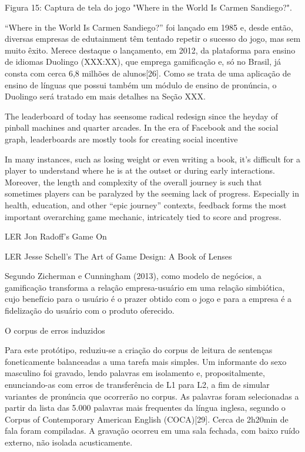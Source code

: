   Figura 15: Captura de tela do jogo "Where in the World Is Carmen
                             Sandiego?".

``Where in the World Is Carmen Sandiego?'' foi lan\c{c}ado em 1985 e, desde
ent\~ao, diversas empresas de edutainment t\^em tentado repetir o sucesso do
jogo, mas sem muito \^exito. Merece destaque o lan\c{c}amento, em 2012, da
plataforma para ensino de idiomas Duolingo (XXX:XX), que emprega
gamifica\c{c}\~ao e, s\'o no Brasil, j\'a consta com cerca 6,8 milh\~oes de
alunos{[}26{]}. Como se trata de uma aplica\c{c}\~ao de ensino de l\'inguas que
possui tamb\'em um m\'odulo de ensino de pron\'uncia, o Duolingo ser\'a tratado
em mais detalhes na Se\c{c}\~ao XXX.

The leaderboard of today has seensome radical redesign since the heyday
of pinball machines and quarter arcades. In the era of Facebook and the
social graph, leaderboards are mostly tools for creating social
incentive

In many instances, such as losing weight or even writing a book, it's
difficult for a player to understand where he is at the outset or during
early interactions. Moreover, the length and complexity of the overall
journey is such that sometimes players can be paralyzed by the seeming
lack of progress. Especially in health, education, and other ``epic
journey'' contexts, feedback forms the most important overarching game
mechanic, intricately tied to score and progress.

LER Jon Radoff's Game On

LER Jesse Schell's The Art of Game Design: A Book of Lenses

Segundo Zicherman e Cunningham (2013), como modelo de neg\'ocios, a
gamifica\c{c}\~ao transforma a rela\c{c}\~ao empresa-usu\'ario em uma rela\c{c}\~ao
simbi\'otica, cujo benef\'icio para o usu\'ario \'e o prazer obtido com o jogo e
para a empresa \'e a fideliza\c{c}\~ao do usu\'ario com o produto oferecido.

O corpus de erros induzidos

Para este prot\'otipo, reduziu-se a cria\c{c}\~ao do corpus de leitura de
senten\c{c}as foneticamente balanceadas a uma tarefa mais simples. Um
informante do sexo masculino foi gravado, lendo palavras em isolamento
e, propositalmente, enunciando-as com erros de transfer\^encia de L1 para
L2, a fim de simular variantes de pron\'uncia que ocorrer\~ao no corpus. As
palavras foram selecionadas a partir da lista das 5.000 palavras mais
frequentes da l\'ingua inglesa, segundo o Corpus of Contemporary American
English (COCA){[}29{]}. Cerca de 2h20min de fala foram compiladas. A
grava\c{c}\~ao ocorreu em uma sala fechada, com baixo ru\'ido externo, n\~ao
isolada acusticamente.

